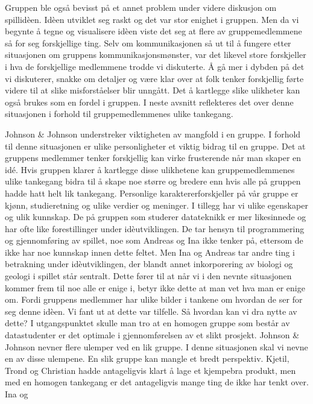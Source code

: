 Gruppen ble også bevisst på et annet problem under videre diskusjon om
spillidèen. Idèen utviklet seg raskt og det var stor enighet i gruppen.
Men da vi begynte å tegne og visualisere idèen viste det seg at flere av
gruppemedlemmene så for seg forskjellige ting. Selv om kommunikasjonen
så ut til å fungere etter situasjonen om gruppens kommunikasjonsmønster,
var det likevel store forskjeller i hva de forskjellige medlemmene
trodde vi diskuterte. Å gå mer i dybden på det vi diskuterer, snakke om
detaljer og være klar over at folk tenker forskjellig førte videre til
at slike misforståelser blir unngått. Det å kartlegge slike ulikheter
kan også brukes som en fordel i gruppen. I neste avsnitt reflekteres det
over denne situasjonen i forhold til gruppemedlemmenes ulike tankegang.

Johnson \& Johnson  \cite{Johnson} understreker viktigheten av mangfold
i en gruppe. I forhold til denne situasjonen er ulike personligheter et
viktig bidrag til en gruppe. Det at gruppens medlemmer tenker
forskjellig kan virke frusterende når man skaper en idé. Hvis gruppen
klarer å kartlegge disse ulikhetene kan gruppemedlemmenes ulike
tankegang bidra til å skape noe større og bredere enn hvis alle på
gruppen hadde hatt helt lik tankegang. Personlige karaktererforskjeller
på vår gruppe er kjønn, studieretning og ulike verdier og meninger. I
tillegg har vi ulike egenskaper og ulik kunnskap. De på gruppen som
studerer datateknikk er mer likesinnede og har ofte like forestillinger
under idèutviklingen. De tar hensyn til programmering og gjennomføring
av spillet, noe som Andreas og Ina ikke tenker på, ettersom de ikke har
noe kunnskap innen dette feltet. Men Ina og Andreas tar andre ting i
betrakning under idèutviklingen, der blandt annet inkorporering av
biologi og geologi i spillet står sentralt. Dette fører til at når vi i
den nevnte situasjonen kommer frem til noe alle er enige i, betyr ikke
dette at man vet hva man er enige om. Fordi gruppens medlemmer har ulike
bilder i tankene om hvordan de ser for seg denne idèen. Vi fant ut at
dette var tilfelle. Så hvordan kan vi dra nytte av dette?  I
utgangspunktet skulle man tro at en homogen gruppe som består av
datastudenter er det optimale i gjennomførelsen av et slikt prosjekt.
Johnson \& Johnson nevner flere ulemper ved en lik gruppe. I denne
situasjonen skal vi nevne en av disse ulempene. En slik gruppe kan
mangle et bredt perspektiv. Kjetil, Trond og Christian hadde
antageligvis klart å lage et kjempebra produkt, men med en homogen
tankegang er det antageligvis mange ting de ikke har tenkt over. Ina og
